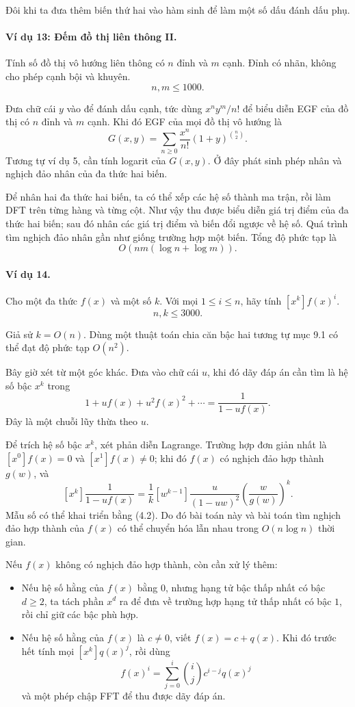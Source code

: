 \documentclass[11pt]{article}
\begin{document}
Đôi khi ta đưa thêm biến thứ hai vào hàm sinh để làm một số dấu đánh dấu phụ.

\paragraph{Ví dụ 13: Đếm đồ thị liên thông II.}
Tính số đồ thị vô hướng liên thông có \(n\) đỉnh và \(m\) cạnh. Đỉnh có nhãn,
không cho phép cạnh bội và khuyên.
\[
  n,m\le 1000.
\]

Đưa chữ cái \(y\) vào để đánh dấu cạnh, tức dùng \(x^n y^m/n!\) để biểu diễn
EGF của đồ thị có \(n\) đỉnh và \(m\) cạnh. Khi đó EGF của mọi đồ thị vô hướng
là
\[
  G(x,y)=\sum_{n\ge 0}\frac{x^n}{n!}(1+y)^{\binom n2}. \tag{10.1}
\]
Tương tự ví dụ 5, cần tính logarit của \(G(x,y)\). Ở đây phát sinh phép nhân và
nghịch đảo nhân của đa thức hai biến.

Để nhân hai đa thức hai biến, ta có thể xếp các hệ số thành ma trận, rồi làm
DFT trên từng hàng và từng cột. Như vậy thu được biểu diễn giá trị điểm của đa
thức hai biến; sau đó nhân các giá trị điểm và biến đổi ngược về hệ số. Quá
trình tìm nghịch đảo nhân gần như giống trường hợp một biến. Tổng độ phức tạp
là
\[
  O(nm(\log n+\log m)).
\]

\paragraph{Ví dụ 14.}
Cho một đa thức \(f(x)\) và một số \(k\). Với mọi \(1\le i\le n\), hãy tính
\([x^k]f(x)^i\).
\[
  n,k\le 3000.
\]

Giả sử \(k=O(n)\). Dùng một thuật toán chia căn bậc hai tương tự mục 9.1 có thể
đạt độ phức tạp \(O(n^2)\).

Bây giờ xét từ một góc khác. Đưa vào chữ cái \(u\), khi đó dãy đáp án cần tìm
là hệ số bậc \(x^k\) trong
\[
  1+uf(x)+u^2f(x)^2+\cdots=\frac1{1-uf(x)}. \tag{10.2}
\]
Đây là một chuỗi lũy thừa theo \(u\).

Để trích hệ số bậc \(x^k\), xét phản diễn Lagrange. Trường hợp đơn giản nhất là
\([x^0]f(x)=0\) và \([x^1]f(x)\ne 0\); khi đó \(f(x)\) có nghịch đảo hợp thành
\(g(w)\), và
\[
  [x^k]\frac1{1-uf(x)}
  =\frac1k[w^{k-1}]\frac{u}{(1-uw)^2}
  \left(\frac{w}{g(w)}\right)^k. \tag{10.3}
\]
Mẫu số có thể khai triển bằng (4.2). Do đó bài toán này và bài toán tìm nghịch
đảo hợp thành của \(f(x)\) có thể chuyển hóa lẫn nhau trong \(O(n\log n)\) thời
gian.

Nếu \(f(x)\) không có nghịch đảo hợp thành, còn cần xử lý thêm:
\begin{itemize}
  \item Nếu hệ số hằng của \(f(x)\) bằng \(0\), nhưng hạng tử bậc thấp nhất có
  bậc \(d\ge 2\), ta tách phần \(x^d\) ra để đưa về trường hợp hạng tử thấp
  nhất có bậc \(1\), rồi chỉ giữ các bậc phù hợp.
  \item Nếu hệ số hằng của \(f(x)\) là \(c\ne 0\), viết \(f(x)=c+q(x)\). Khi
  đó trước hết tính mọi \([x^k]q(x)^j\), rồi dùng
  \[
    f(x)^i=\sum_{j=0}^i \binom{i}{j}c^{i-j}q(x)^j
  \]
  và một phép chập FFT để thu được dãy đáp án.
\end{itemize}
\end{document}
